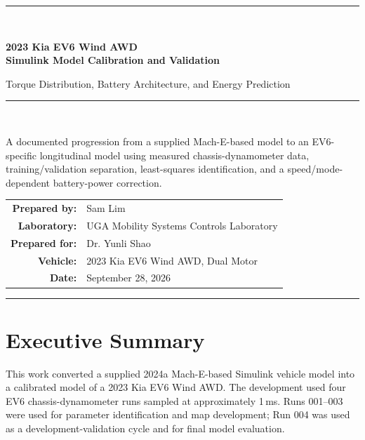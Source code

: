 \documentclass[11pt,letterpaper]{article}
\newcommand{\SI}[2]{#1\,#2}
\begin{document}
\begin{titlepage}
  \centering
  \vspace*{0.65in}
  {\color{ev6navy}\rule{\textwidth}{2.2pt}}\\[0.35in]
  {\Huge\bfseries 2023 Kia EV6 Wind AWD\\[0.12in]
  Simulink Model Calibration and Validation\par}
  \vspace{0.28in}
  {\Large Torque Distribution, Battery Architecture, and Energy Prediction\par}
  \vspace{0.32in}
  {\color{ev6navy}\rule{0.72\textwidth}{0.8pt}}\\[0.42in]

  \begin{keybox}[width=0.86\textwidth]
  \centering
  A documented progression from a supplied Mach-E-based model to an
  EV6-specific longitudinal model using measured chassis-dynamometer data,
  training/validation separation, least-squares identification, and a
  speed/mode-dependent battery-power correction.
  \end{keybox}

  \vfill
  \begin{tabular}{rl}
    \textbf{Prepared by:} & Sam Lim \\
    \textbf{Laboratory:} & UGA Mobility Systems Controls Laboratory \\
    \textbf{Prepared for:} & Dr. Yunli Shao \\
    \textbf{Vehicle:} & 2023 Kia EV6 Wind AWD, Dual Motor \\
    \textbf{Date:} & September 28, 2026
  \end{tabular}
  \vfill
  {\color{ev6navy}\rule{\textwidth}{2.2pt}}
\end{titlepage}

\tableofcontents
\clearpage
{}

\section{Executive Summary}

This work converted a supplied 2024a Mach-E-based Simulink vehicle model into a
calibrated model of a 2023 Kia EV6 Wind AWD. The development used four EV6
chassis-dynamometer runs sampled at approximately \SI{1}{ms}. Runs 001--003
were used for parameter identification and map development; Run 004 was used as
a development-validation cycle and for final model evaluation.
\end{document}
